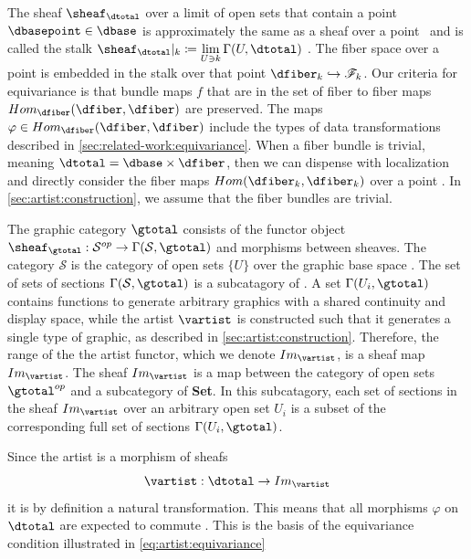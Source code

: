 \documentclass[10pt,journal,compsoc]{IEEEtran}
\theoremstyle{definition}
\theoremstyle{remark}
\begin{document}
The sheaf $\sheaf_{\dtotal}$ over a limit of open sets that contain a point $\dbasepoint \in \dbase$ is approximately the same as a sheaf over a point \dbasepoint\ and is called the stalk $\sheaf_{\mathcal{\dtotal}}|_{k}\coloneqq \lim\limits_{U\ni k} \Gamma(U, \dtotal)$ \cite{StalkSheaf2019}. The fiber space over a point is embedded in the stalk over that point $\dfiber_{k}\hookrightarrow \mathscr{F}_{k}$. Our criteria for equivariance is that bundle maps $f$ that are in the set of fiber to fiber maps $Hom_{\mathcal{\dfiber}}(\dfiber,\dfiber)$ are preserved. The maps $\varphi \in Hom_{\mathcal{\dfiber}}(\dfiber,\dfiber)$ include the types of data transformations described in \autoref{sec:related-work:equivariance}. When a fiber bundle is trivial, meaning $\dtotal=\dbase \times \dfiber$, then we can dispense with localization and directly consider the fiber maps $Hom(\dfiber_{k}, \dfiber_{k})$ over a point \dbasepoint. In \autoref{sec:artist:construction}, we assume that the fiber bundles are trivial.

The graphic category $\mathcal{\gtotal}$ consists of the functor object $\sheaf_{\gtotal}: \mathcal{S}^{op} \rightarrow \Gamma(\mathcal{S}, \gtotal)$ and morphisms between sheaves. The category $\mathcal{S}$ is the category of open sets $\{U\}$ over the graphic base space \gbase. The set of sets of sections $\Gamma(\mathcal{S}, \gtotal)$ is a subcatagory of . A set $\Gamma(U_i, \gtotal)$ contains functions to generate arbitrary graphics with a shared continuity and display space, while the artist $\vartist$ is constructed such that it generates a single type of graphic, as described in \autoref{sec:artist:construction}. Therefore, the range of the the artist functor, which we denote $Im_{\vartist}$, is a sheaf map $Im_{\vartist}$. The sheaf $Im_{\vartist}$ is a map between the category of open sets $\gtotal^{op}$ and a subcategory of \textbf{Set}. In this subcatagory, each set of sections in the sheaf $Im_{\vartist}$ over an arbitrary open set $U_{i}$ is a subset of the corresponding full set of sections $\Gamma(U_i, \gtotal)$. 



Since the artist is a morphism of sheafs
\begin{equation}
  \vartist: \mathcal{\dtotal} \rightarrow Im_{\vartist}
\end{equation}
it is by definition a natural transformation\cite{SheafMathematics2021,bradleyWhatNaturalTransformation}. This means that all morphisms $\varphi$ on $\mathcal{\dtotal}$ are expected to commute \cite{spanier1989algebraic,fongInvitationAppliedCategory2019}. This is the basis of the equivariance condition illustrated in \autoref{eq:artist:equivariance}
\end{document}
